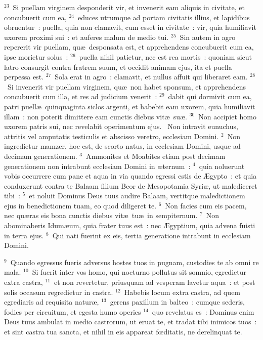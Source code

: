${}^{23}$~Si puellam virginem desponderit vir, et invenerit eam aliquis in civitate, et concubuerit cum ea,
${}^{24}$~educes utrumque ad portam civitatis illius, et lapidibus obruentur~: puella, quia non clamavit, cum esset in civitate~: vir, quia humiliavit uxorem proximi sui~: et auferes malum de medio tui.
${}^{25}$~Sin autem in agro repererit vir puellam, qu\ae\ desponsata est, et apprehendens concubuerit cum ea, ipse morietur solus~:
${}^{26}$~puella nihil patietur, nec est rea mortis~: quoniam sicut latro consurgit contra fratrem suum, et occidit animam ejus, ita et puella perpessa est.
${}^{27}$~Sola erat in agro~: clamavit, et nullus affuit qui liberaret eam.
${}^{28}$~Si invenerit vir puellam virginem, qu\ae\ non habet sponsum, et apprehendens concubuerit cum illa, et res ad judicium venerit~:
${}^{29}$~dabit qui dormivit cum ea, patri puell\ae\ quinquaginta siclos argenti, et habebit eam uxorem, quia humiliavit illam~: non poterit dimittere eam cunctis diebus vit\ae\ su\ae .
${}^{30}$~Non accipiet homo uxorem patris sui, nec revelabit operimentum ejus.
~\lettrine[lines=10,image=true,loversize=0.05,lraise=-0.03]{N}{}on intravit eunuchus, attritis vel amputatis testiculis et abscisso veretro, ecclesiam Domini.
${}^{2}$~Non ingredietur mamzer, hoc est, de scorto natus, in ecclesiam Domini, usque ad decimam generationem.
${}^{3}$~Ammonites et Moabites etiam post decimam generationem non intrabunt ecclesiam Domini in \ae ternum~:
${}^{4}$~quia noluerunt vobis occurrere cum pane et aqua in via quando egressi estis de \AE gypto~: et quia conduxerunt contra te Balaam filium Beor de Mesopotamia Syri\ae , ut malediceret tibi~:
${}^{5}$~et noluit Dominus Deus tuus audire Balaam, vertitque maledictionem ejus in benedictionem tuam, eo quod diligeret te.
${}^{6}$~Non facies cum eis pacem, nec qu\ae ras eis bona cunctis diebus vit\ae\ tu\ae\ in sempiternum.
${}^{7}$~Non abominaberis Idum\ae um, quia frater tuus est~: nec \AE gyptium, quia advena fuisti in terra ejus.
${}^{8}$~Qui nati fuerint ex eis, tertia generatione intrabunt in ecclesiam Domini.


${}^{9}$~Quando egressus fueris adversus hostes tuos in pugnam, custodies te ab omni re mala.
${}^{10}$~Si fuerit inter vos homo, qui nocturno pollutus sit somnio, egredietur extra castra,
${}^{11}$~et non revertetur, priusquam ad vesperam lavetur aqua~: et post solis occasum regredietur in castra.
${}^{12}$~Habebis locum extra castra, ad quem egrediaris ad requisita natur\ae ,
${}^{13}$~gerens paxillum in balteo~: cumque sederis, fodies per circuitum, et egesta humo operies
${}^{14}$~quo revelatus es~: Dominus enim Deus tuus ambulat in medio castrorum, ut eruat te, et tradat tibi inimicos tuos~: et sint castra tua sancta, et nihil in eis appareat fœditatis, ne derelinquat te.



